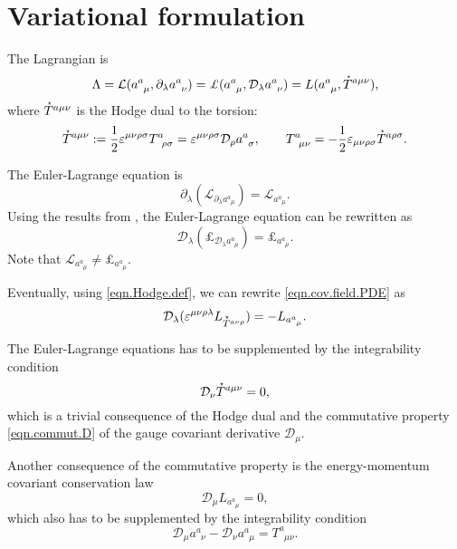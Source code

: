 \documentclass[
10pt, %
a4paper, %
oneside, %
headinclude,footinclude, %
BCOR5mm, %
]{scrartcl}
\newcommand{\pd}{\partial}
\newcommand{\tetr}[2]{a^{#1}_{\phantom{#1}#2}}
\newcommand{\D}[1]{\mathcal{D}_{#1}} %
\newcommand{\Tors}[2]{T^{#1}_{\phantom{a}#2}}
\newcommand{\Lag}{\mathcal{L}}	%
\newcommand{\Lagcov}{\pounds}%
\newcommand{\Laghodge}{L}%
\newcommand{\veps}{\varepsilon}
\newcommand{\HT}[1]{\accentset{\star}{T}^{#1}}
\begin{document}
\section{Variational formulation}
The Lagrangian is 
\begin{equation}
\Lambda = \Lag(\tetr{a}{\mu},\pd_\lambda\tetr{a}{\nu}) = 
\Lagcov(\tetr{a}{\mu},\D{\lambda}\tetr{a}{\nu})  = \Laghodge(\tetr{a}{\mu},\HT{a\mu\nu}),
\end{equation}
where $ \HT{a\mu\nu} $ is the Hodge dual to the torsion:
\begin{equation}\label{eqn.Hodge.def}
\HT{a\mu\nu} := \frac{1}{2}\veps^{\mu\nu\rho\sigma}\Tors{a}{\rho\sigma} = 
\veps^{\mu\nu\rho\sigma}\D{\rho}\tetr{a}{\sigma}, \qquad \Tors{a}{\mu\nu} = 
-\frac{1}{2}\veps_{\mu\nu\rho\sigma}\HT{a\rho\sigma}.
\end{equation}




The Euler-Lagrange equation is
\begin{equation}
\pd_\lambda(\Lag_{\pd_\lambda\tetr{a}{\mu}}) = \Lag_{\tetr{a}{\mu}}.
\end{equation}
Using the results from \cite{Lewis2009,Lorce2013}, the Euler-Lagrange equation can be rewritten as
\begin{equation}\label{eqn.cov.field.PDE}
\D{\lambda}(\Lagcov_{\D{\lambda}\tetr{a}{\mu}}) = \Lagcov_{\tetr{a}{\mu}}.
\end{equation}
Note that $  \Lag_{\tetr{a}{\mu}} \neq  \Lagcov_{\tetr{a}{\mu}}. $

Eventually, using \eqref{eqn.Hodge.def}, we can rewrite \eqref{eqn.cov.field.PDE} as
\begin{equation}\label{eqn.cov.field.PDE.Hodge}
\D{\lambda}(\veps^{\mu\nu\rho\lambda}\Laghodge_{\HT{a\nu\rho}}) =-\Laghodge_{\tetr{a}{\mu}}.
\end{equation}

The Euler-Lagrange equations has to be supplemented by the integrability condition
\begin{equation}
\D{\nu}\HT{a\mu\nu} = 0,
\end{equation}
which is a trivial consequence of the Hodge dual and the commutative property \eqref{eqn.commut.D} 
of the gauge 
covariant derivative $ \D{\mu} $.

Another consequence of the commutative property is the energy-momentum covariant conservation law
\begin{equation}
\D{\mu}\Laghodge_{\tetr{a}{\mu}} = 0,
\end{equation}
which also has to be supplemented by the integrability condition 
\begin{equation}
\D{\mu}\tetr{a}{\nu} - \D{\nu}\tetr{a}{\mu} = \Tors{a}{\mu\nu}.
\end{equation}
\end{document}
